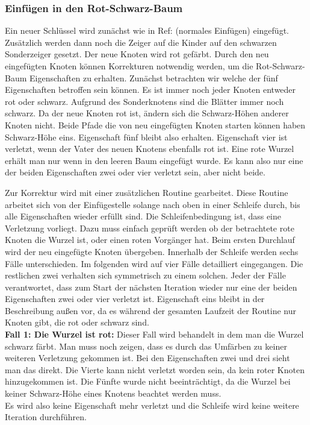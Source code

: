 \documentclass[a4paper,12pt]{article}
\begin{document}
\subsubsection{Einfügen in den Rot-Schwarz-Baum}
Ein neuer Schlüssel wird zunächst wie in Ref: (normales Einfügen) eingefügt. Zusätzlich werden dann noch die Zeiger auf die Kinder auf den schwarzen Sonderzeiger gesetzt. Der neue Knoten wird rot gefärbt. Durch den neu eingefügten Knoten können Korrekturen notwendig werden, um die Rot-Schwarz-Baum Eigenschaften zu erhalten. Zunächst betrachten wir welche der fünf Eigenschaften betroffen sein können. Es ist immer noch jeder Knoten entweder rot oder schwarz. Aufgrund des Sonderknotens sind die Blätter immer noch schwarz. Da der neue Knoten rot ist, ändern sich die Schwarz-Höhen anderer Knoten nicht. Beide Pfade die von neu eingefügten Knoten starten können haben Schwarz-Höhe eins. Eigenschaft fünf bleibt also erhalten. Eigenschaft vier ist verletzt, wenn der Vater des neuen Knotens ebenfalls rot ist. Eine rote Wurzel erhält man nur wenn in den leeren Baum eingefügt wurde. Es kann also nur eine der beiden Eigenschaften zwei oder vier verletzt sein, aber nicht beide.

 \noindent Zur Korrektur wird mit einer zusätzlichen Routine gearbeitet. Diese Routine arbeitet sich von der Einfügestelle solange nach oben in einer Schleife durch, bis alle Eigenschaften wieder erfüllt sind. Die Schleifenbedingung ist, dass eine Verletzung vorliegt. Dazu muss einfach geprüft werden ob der betrachtete rote Knoten die Wurzel ist, oder einen roten Vorgänger hat. Beim ersten Durchlauf wird der neu eingefügte Knoten übergeben. Innerhalb der Schleife werden sechs Fälle unterschieden. Im folgenden wird auf vier Fälle detailliert eingegangen. Die restlichen zwei verhalten sich symmetrisch zu einem solchen. Jeder der Fälle verantwortet, dass zum Start der nächsten Iteration wieder nur eine der beiden Eigenschaften zwei oder vier verletzt ist. Eigenschaft eins bleibt in der Beschreibung außen vor, da es während der gesamten Laufzeit der Routine nur Knoten gibt, die rot oder schwarz sind. \\
\textbf{Fall 1: Die Wurzel ist rot: }
Dieser Fall wird behandelt in dem man die Wurzel schwarz färbt. Man muss noch zeigen, dass es durch das Umfärben zu keiner weiteren Verletzung gekommen ist. Bei den Eigenschaften zwei und drei sieht man das direkt. Die Vierte kann nicht verletzt worden sein, da kein roter Knoten hinzugekommen ist. Die Fünfte wurde nicht beeinträchtigt, da die Wurzel bei keiner Schwarz-Höhe eines Knotens beachtet werden muss.   \\
Es wird also keine Eigenschaft mehr verletzt und die Schleife wird keine weitere Iteration durchführen.
\end{document}
